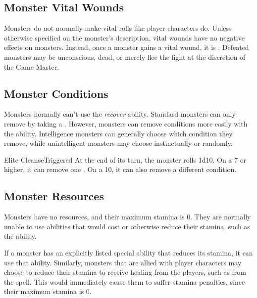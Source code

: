   \subsection{Monster Vital Wounds}
    Monsters do not normally make vital rolls like player characters do.
    Unless otherwise specified on the monster's description, vital wounds have no negative effects on monsters.
    Instead, once a monster gains a vital wound, it is .
    Defeated monsters may be unconscious, dead, or merely flee the fight at the discretion of the Game Master.

  \subsection{Monster Conditions}\label{Monster Conditions}
    Monsters normally can't use the \textit{recover} ability.
    Standard monsters can only remove  by taking a .
    However,  monsters can remove conditions more easily with the  ability.
    Intelligence monsters can generally choose which condition they remove, while unintelligent monsters may choose instinctually or randomly.

    \begin{triggeredability}{Elite Cleanse}{Triggered}
      \rankline
      At the end of its turn, the monster rolls 1d10.
      On a 7 or higher, it can remove one .
      On a 10, it can also remove a different condition.
    \end{triggeredability}

  \subsection{Monster Resources}
    Monsters have no resources, and their maximum stamina is 0.
    They are normally unable to use abilities that would cost or otherwise reduce their stamina, such as the  ability.

    If a monster has an explicitly listed special ability that reduces its stamina, it can use that ability.
    Similarly, monsters that are allied with player characters may choose to reduce their stamina to receive healing from the players, such as from the  spell.
    This would immediately cause them to suffer stamina penalties, since their maximum stamina is 0.

